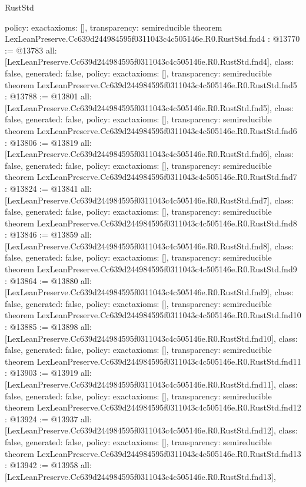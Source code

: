 \begin{lexlean}{RustStd}
\begin{coremodule}
{  policy: exact{axioms: []},
  transparency: semireducible
}
theorem LexLeanPreserve.Cc639d244984595f0311043c4c505146e.R0.RustStd.fnd4 : @13770 := @13783 {
  all: [LexLeanPreserve.Cc639d244984595f0311043c4c505146e.R0.RustStd.fnd4],
  class: false,
  generated: false,
  policy: exact{axioms: []},
  transparency: semireducible
}
theorem LexLeanPreserve.Cc639d244984595f0311043c4c505146e.R0.RustStd.fnd5 : @13788 := @13801 {
  all: [LexLeanPreserve.Cc639d244984595f0311043c4c505146e.R0.RustStd.fnd5],
  class: false,
  generated: false,
  policy: exact{axioms: []},
  transparency: semireducible
}
theorem LexLeanPreserve.Cc639d244984595f0311043c4c505146e.R0.RustStd.fnd6 : @13806 := @13819 {
  all: [LexLeanPreserve.Cc639d244984595f0311043c4c505146e.R0.RustStd.fnd6],
  class: false,
  generated: false,
  policy: exact{axioms: []},
  transparency: semireducible
}
theorem LexLeanPreserve.Cc639d244984595f0311043c4c505146e.R0.RustStd.fnd7 : @13824 := @13841 {
  all: [LexLeanPreserve.Cc639d244984595f0311043c4c505146e.R0.RustStd.fnd7],
  class: false,
  generated: false,
  policy: exact{axioms: []},
  transparency: semireducible
}
theorem LexLeanPreserve.Cc639d244984595f0311043c4c505146e.R0.RustStd.fnd8 : @13846 := @13859 {
  all: [LexLeanPreserve.Cc639d244984595f0311043c4c505146e.R0.RustStd.fnd8],
  class: false,
  generated: false,
  policy: exact{axioms: []},
  transparency: semireducible
}
theorem LexLeanPreserve.Cc639d244984595f0311043c4c505146e.R0.RustStd.fnd9 : @13864 := @13880 {
  all: [LexLeanPreserve.Cc639d244984595f0311043c4c505146e.R0.RustStd.fnd9],
  class: false,
  generated: false,
  policy: exact{axioms: []},
  transparency: semireducible
}
theorem LexLeanPreserve.Cc639d244984595f0311043c4c505146e.R0.RustStd.fnd10 : @13885 := @13898 {
  all: [LexLeanPreserve.Cc639d244984595f0311043c4c505146e.R0.RustStd.fnd10],
  class: false,
  generated: false,
  policy: exact{axioms: []},
  transparency: semireducible
}
theorem LexLeanPreserve.Cc639d244984595f0311043c4c505146e.R0.RustStd.fnd11 : @13903 := @13919 {
  all: [LexLeanPreserve.Cc639d244984595f0311043c4c505146e.R0.RustStd.fnd11],
  class: false,
  generated: false,
  policy: exact{axioms: []},
  transparency: semireducible
}
theorem LexLeanPreserve.Cc639d244984595f0311043c4c505146e.R0.RustStd.fnd12 : @13924 := @13937 {
  all: [LexLeanPreserve.Cc639d244984595f0311043c4c505146e.R0.RustStd.fnd12],
  class: false,
  generated: false,
  policy: exact{axioms: []},
  transparency: semireducible
}
theorem LexLeanPreserve.Cc639d244984595f0311043c4c505146e.R0.RustStd.fnd13 : @13942 := @13958 {
  all: [LexLeanPreserve.Cc639d244984595f0311043c4c505146e.R0.RustStd.fnd13],
}
\end{coremodule}
\end{lexlean}
